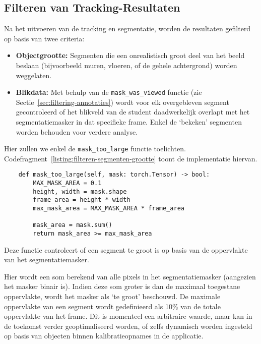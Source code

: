 
\subsection{Filteren van Tracking-Resultaten}

Na het uitvoeren van de tracking en segmentatie, worden de resultaten gefilterd op basis van twee criteria:
\begin{itemize}
    \item \textbf{Objectgrootte:} Segmenten die een onrealistisch groot deel van het beeld beslaan (bijvoorbeeld muren, vloeren, of de gehele achtergrond) worden weggelaten.
    \item \textbf{Blikdata:} Met behulp van de \texttt{mask\_was\_viewed} functie (zie Sectie~\ref{sec:filtering-annotaties}) 
    wordt voor elk overgebleven segment gecontroleerd of het blikveld van de student daadwerkelijk overlapt met het segmentatiemasker in dat specifieke frame. 
    Enkel de `bekeken' segmenten worden behouden voor verdere analyse.
\end{itemize}

Hier zullen we enkel de \texttt{mask\_too\_large} functie toelichten.
Codefragment~\ref{listing:filteren-segmenten-grootte} toont de implementatie hiervan.

\begin{listing}[H]
  \begin{verbatim}
    def mask_too_large(self, mask: torch.Tensor) -> bool:
        MAX_MASK_AREA = 0.1
        height, width = mask.shape
        frame_area = height * width
        max_mask_area = MAX_MASK_AREA * frame_area

        mask_area = mask.sum()
        return mask_area >= max_mask_area
    \end{verbatim}
  \caption[Filteren van segmenten op basis van grootte]{
    \label{listing:filteren-segmenten-grootte}  
    Deze functie controleert of een segment te groot is op basis van de oppervlakte van het segmentatiemasker. 
  }
\end{listing}

Hier wordt een som berekend van alle pixels in het segmentatiemasker (aangezien het masker binair is).
Indien deze som groter is dan de maximaal toegestane oppervlakte, wordt het masker als `te groot' beschouwd.
De maximale oppervlakte van een segment wordt gedefinieerd als 10\% van de totale oppervlakte van het frame.
Dit is momenteel een arbitraire waarde, maar kan in de toekomst verder geoptimaliseerd worden, of zelfs 
dynamisch worden ingesteld op basis van objecten binnen kalibratieopnames in de applicatie.


